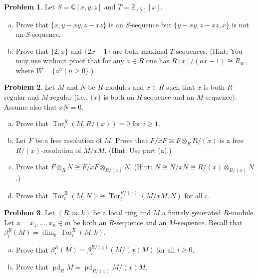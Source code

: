 \documentclass[11pt]{article}
\newcommand{\Z}{\mathbb{Z}}
\theoremstyle{definition}
\newtheorem{problem}{Problem}
\newcommand{\Q}{\mathbb{Q}}
\newcommand{\pd}{\operatorname{pd}}
\newcommand{\Tor}{\operatorname{Tor}}
\begin{document}
\medskip

\begin{problem} Let $S=\Q[x,y,z]$ and $T=\Z_{(2)}[x]$.
\begin{enumerate}[(a)]
\item Prove that $\{x, y-xy, z-xz\}$ is an $S$-sequence but $\{y-xy, z-xz, x\}$ is not an $S$-sequence.
\item Prove that $\{2,x\}$ and $\{2x-1\}$ are both maximal $T$-sequences.  (Hint: You may use without proof that for any $a\in R$ one has $R[x]/(ax-1)\cong R_W$, where $W=\{a^n\mid n\ge 0\}$.)
\end{enumerate}
\end{problem}

\medskip

\begin{problem} Let $M$ and $N$ be $R$-modules and $x\in R$ such that $x$ is both $R$-regular and $M$-regular (i.e., $\{x\}$ is both an $R$-sequence and an $M$-sequence).  Assume also that $xN=0$.
\begin{enumerate}[(a)]
\item Prove that $\Tor_i^R(M,R/(x))=0$ for $i\ge 1$.
\item Let $F$ be a free resolution of $M$.  Prove that $F/xF\cong F\otimes_R R/(x)$ is a free $R/(x)$-resolution of $M/xM$.  (Hint: Use part (a).)
\item  Prove that $F\otimes_R N\cong F/xF\otimes_{R/(x)} N$.  (Hint: $N\cong N/xN\cong R/(x)\otimes_{R/(x)} N$.)
\item  Prove that $\Tor_i^R(M,N)\cong \Tor_i^{R/(x)}(M/xM,N)$ for all $i$.
\end{enumerate}
\end{problem}

\medskip

\begin{problem} Let $(R,m,k)$ be a local ring and $M$ a finitely generated $R$-module.  Let $\underline{x}=x_1,\dots,x_n\in m$ be both an $R$-sequence and an $M$-sequence.  Recall that $\beta_i^R(M)=\dim_k \Tor_i^R(M,k)$.
\begin{enumerate}[(a)]
\item Prove that $\beta_i^R(M)=\beta_i^{R/(\underline{x})}(M/(\underline{x})M)$ for all $i\ge 0$.
\item Prove that $\pd_R M=\pd_{R/(\underline{x})} M/(\underline{x})M$.
\end{enumerate}
\end{problem}
\end{document}
